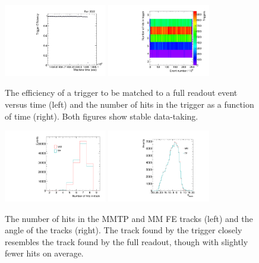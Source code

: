 \begin{figure}[!htpb]
  \begin{center}
    \includegraphics[width=0.4\textwidth]{figures/gbtanalysis3522/tpeff.pdf}
    \includegraphics[width=0.4\textwidth]{figures/tuna_analysis/trigger_hits_vs_event.pdf}
  \end{center}
  \vspace{-10pt}
  \caption{The efficiency of a trigger to be matched to a full readout event versus time (left) and the number of hits in the trigger as a function of time (right). Both figures show stable data-taking.}
  \label{fig:lowlevel}
\end{figure}

\begin{figure}[!htpb]
  \begin{center}
    \includegraphics[width=0.4\textwidth]{figures/tuna_analysis/trigger_nart.pdf}
    \includegraphics[width=0.4\textwidth]{figures/gbtanalysis3522/ang.pdf}
  \end{center}
  \vspace{-10pt}
  \caption{The number of hits in the MMTP and MM FE tracks (left) and the angle of the tracks (right). The track found by the trigger closely resembles the track found by the full readout, though with slightly fewer hits on average.}
  \label{fig:tp_vs_fe}
\end{figure}

